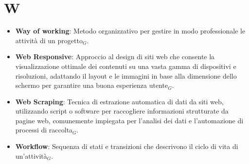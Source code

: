 \section{W}
\begin{itemize}
    \item \textbf{Way of working}: Metodo organizzativo per gestire in modo professionale le attività di un progetto$_G$.
    \item \textbf{Web Responsive}: Approccio al design di siti web che consente la visualizzazione ottimale dei contenuti su una vasta gamma di dispositivi e risoluzioni, adattando il layout e le immagini in base alla dimensione dello schermo per garantire una buona esperienza utente$_G$.
    \item \textbf{Web Scraping}: Tecnica di estrazione automatica di dati da siti web, utilizzando script o software per raccogliere informazioni strutturate da pagine web, comunemente impiegata per l'analisi dei dati e l'automazione di processi di raccolta$_G$.
    \item \textbf{Workflow}: Sequenza di stati e transizioni che descrivono il ciclo di vita di un’attività$_G$.
\end{itemize}

